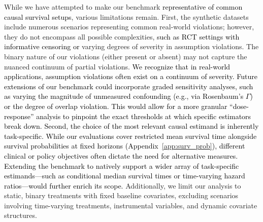 \documentclass{article} %
\newcommand{\rebuttal}[1]{\textcolor{black}{#1}}
\begin{document}

While we have attempted to make our benchmark \rebuttal{representative of common causal survival setups}, various limitations remain. First, the synthetic datasets include numerous scenarios representing common real-world violations; however, they do not encompass all possible complexities, \rebuttal{such as RCT settings with informative censoring or}
varying degrees of severity in assumption violations. The binary nature of our violations (either present or absent) may not capture the nuanced continuum of partial violations. 
\rebuttal{We recognize that in real-world applications, assumption violations often exist on a continuum of severity. Future extensions of our benchmark could incorporate graded sensitivity analyses, such as varying the magnitude of unmeasured confounding (e.g., via Rosenbaum's $\Gamma$) or the degree of overlap violation. This would allow for a more granular ``dose-response'' analysis to pinpoint the exact thresholds at which specific estimators break down.}
\rebuttal{Second, the choice of the most relevant causal estimand is inherently task-specific. While our evaluations cover restricted mean survival time alongside survival probabilities at fixed horizons (Appendix~\ref{app:surv_prob}), different clinical or policy objectives often dictate the need for alternative measures. Extending the benchmark to natively support a wider array of task-specific estimands---such as conditional median survival times or time-varying hazard ratios---would further enrich its scope.}
Additionally, we limit our analysis to static, binary treatments with fixed baseline covariates, excluding scenarios involving time-varying treatments, instrumental variables, and dynamic covariate structures. %
\end{document}
